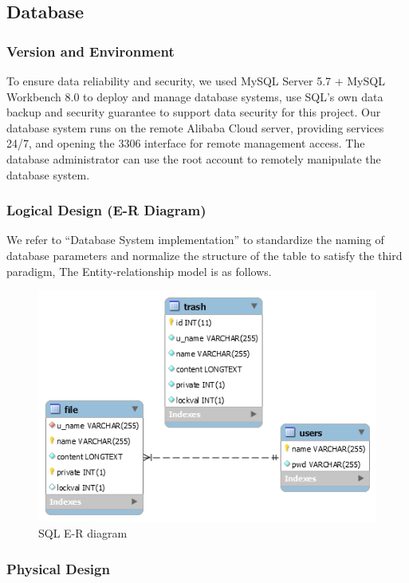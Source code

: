 \documentclass[a4paper,11pt]{article}
\begin{document}
\subsection{Database}
\subsubsection{Version and Environment}
\par To ensure data reliability and security, we used MySQL Server 5.7 + MySQL Workbench 8.0 to deploy and manage database systems, use SQL's own data backup and security guarantee to support data security for this project. Our database system runs on the remote Alibaba Cloud server, providing services 24/7, and opening the 3306 interface for remote management access. The database administrator can use the root account to remotely manipulate the database system.
\subsubsection{Logical Design (E-R Diagram)}

\par We refer to “Database System implementation” to standardize the naming of database parameters and normalize the structure of the table to satisfy the third paradigm, The Entity-relationship model is as follows.

\begin{figure}[ht]

\centering
\includegraphics[scale=0.6]{SQL-E-R.png}
\caption{SQL E-R diagram}
\label{fig:SQL E-R}
\end{figure}

\subsubsection{Physical Design}
\end{document}
